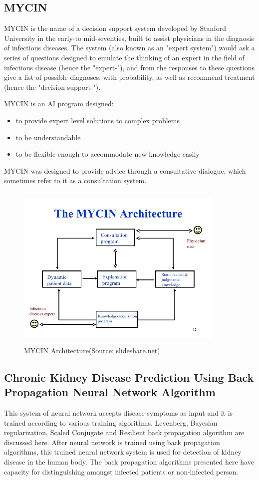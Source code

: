 \subsection{MYCIN}
MYCIN is the name of a decision support system developed by Stanford University in the early-to mid-seventies, built to assist physicians in the diagnosis of infectious diseases. The system (also known as an "expert system") would ask a series of questions designed to emulate the thinking of an expert in the field of infectious disease (hence the "expert-"), and from the responses to these questions give a list of possible diagnoses, with probability, as well as recommend treatment (hence the "decision support-").\par 
MYCIN is an AI program designed: 
\begin{itemize}
    \item to provide expert level solutions to complex problems
    \item to be understandable
    \item to be flexible enough to accommodate new knowledge easily
\end{itemize}
MYCIN was designed to provide advice through a consultative dialogue, which sometimes refer to it as a consultation system.

\begin{figure}[H]
\begin{center}
\includegraphics[width=100mm, height = 80mm]{images/mycin.jpg}
\caption{MYCIN Architecture(Source: slideshare.net)}
\end{center}
\end{figure}
\subsection{Chronic Kidney Disease Prediction Using Back Propagation Neural Network Algorithm}
This system of neural network accepts disease-symptoms as input and it is trained according to various training algorithms. Levenberg, Bayesian regularization, Scaled Conjugate and Resilient back propagation algorithm are discussed here. After neural network is trained using back propagation algorithms, this trained neural network system is used for detection of kidney disease in the human body. The back propagation algorithms presented here have capacity for distinguishing amongst infected patients or non-infected person.
